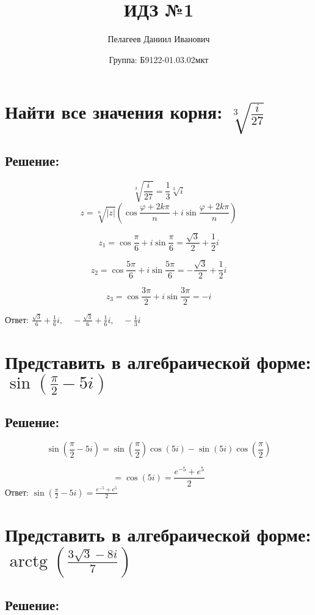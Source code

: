 \documentclass{article}
\title{\vspace{-1cm}ИДЗ №1}
\author{Пелагеев Даниил Иванович}
\date{Группа: Б9122-01.03.02мкт}
\begin{document}
	
	\maketitle



\section{Найти все значения корня: $\sqrt[3]{\frac{i}{27}}$}
\subsection{Решение:}

\[
\sqrt[3]{\frac{i}{27}} = \frac{1}{3} \sqrt[3]{i}
\]
\[
z = \sqrt[n]{|z|} \left( \cos \frac{\varphi + 2k\pi}{n} + i \sin \frac{\varphi + 2k\pi}{n} \right)
\]

\[
z_1 = \cos \frac{\pi}{6} + i \sin \frac{\pi}{6} = \frac{\sqrt{3}}{2} + \frac{1}{2}i
\]

\[
z_2 = \cos \frac{5\pi}{6} + i \sin \frac{5\pi}{6} = -\frac{\sqrt{3}}{2} + \frac{1}{2}i
\]

\[
z_3 = \cos \frac{3\pi}{2} + i \sin \frac{3\pi}{2} = -i
\]

Ответ: $\frac{\sqrt{3}}{6} + \frac{1}{6}i, \quad -\frac{\sqrt{3}}{6} + \frac{1}{6}i, \quad -\frac{1}{3}i$

\section{Представить в алгебраической форме: $\sin \left( \frac{\pi}{2} - 5i \right)$}
\subsection{Решение:}

\[
\sin \left( \frac{\pi}{2} - 5i \right) = \sin \left( \frac{\pi}{2} \right) \cos (5i) -  \sin(5i) \cos \left( \frac{\pi}{2} \right)
\]

\[
= \cos (5i) = \frac{e^{-5} + e^{5}}{2}
\]
Ответ: $\sin \left( \frac{\pi}{2} - 5i \right) = \frac{e^{-5} + e^{5}}{2}$

\section{Представить в алгебраической форме: $\operatorname{arctg} \left( \frac{3\sqrt{3} - 8i}{7} \right)$}
\subsection{Решение:}
\end{document}
